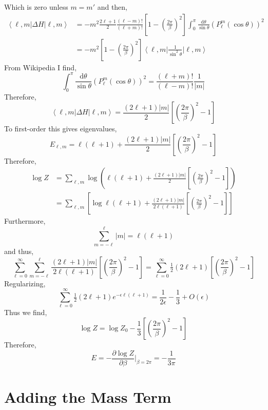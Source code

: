\documentclass[12pt]{extarticle}
\renewcommand{\d}[1]{\: \mathrm{d}#1 \:}
\newcommand{\pderiv}[2]{\frac{\partial{#1}}{\partial{#2}}}
\newcommand{\bra}[1]{\left< #1 \right|}
\newcommand{\ket}[1]{\left| #1 \right>}
\theoremstyle{definition}
\begin{document}
Which is zero unless $m = m'$ and then,
\begin{align*}
\bra{\ell, m} \Delta H \ket{\ell, m} & = -m^2 \frac{2 \ell + 1}{2} \frac{(\ell - m)!}{(\ell + m)!} \left[ 1 -  \left(\frac{2 \pi}{\beta} \right)^2  \right] \int_0^\pi \frac{\d{\theta}}{\sin{\theta}} (P^m_{\ell}(\cos{\theta}))^2 
\\
& = - m^2 \left[ 1 -  \left(\frac{2 \pi}{\beta} \right)^2  \right] \bra{\ell, m} \frac{1}{\sin^2{\theta}} \ket{\ell, m}
\end{align*}
From Wikipedia I find,
\[ \int_0^\pi \frac{\d{\theta}}{\sin{\theta}} (P^m_{\ell}(\cos{\theta}))^2 = \frac{(\ell + m)!}{(\ell - m)!} \frac{1}{|m|} \]
Therefore,
\[ \bra{\ell, m} \Delta H \ket{\ell, m} = \frac{(2 \ell + 1) |m| }{2} \left[ \left(\frac{2 \pi}{\beta} \right)^2 - 1 \right] \]
To first-order this gives eigenvalues,
\[ E_{\ell, m} = \ell (\ell + 1) + \frac{(2 \ell + 1) |m| }{2} \left[ \left(\frac{2 \pi}{\beta} \right)^2 - 1 \right] \]
Therefore,
\begin{align*}
\log{Z} & = \sum_{\ell, m} \log{\left( \ell (\ell + 1) + \frac{(2 \ell + 1) |m| }{2} \left[ \left(\frac{2 \pi}{\beta} \right)^2 - 1 \right] \right)}
\\
& = \sum_{\ell, m} \left[ \log{\ell(\ell + 1)} + \frac{(2 \ell + 1) |m| }{2 \ell(\ell + 1)} \left[ \left(\frac{2 \pi}{\beta} \right)^2 - 1 \right] \right]
\end{align*}
Furthermore,
\[ \sum_{m = -\ell}^\ell |m| = \ell(\ell + 1) \]
and thus,
\[ \sum_{\ell = 0}^\infty \sum_{m = - \ell}^\ell \frac{(2 \ell + 1) |m| }{2 \ell(\ell + 1)} \left[ \left(\frac{2 \pi}{\beta} \right)^2 - 1 \right]  = \sum_{\ell = 0}^\infty \tfrac{1}{2} (2\ell + 1) \left[ \left(\frac{2 \pi}{\beta} \right)^2 - 1 \right] \]
Regularizing,
\[ \sum_{\ell = 0}^\infty \tfrac{1}{2} (2\ell + 1) e^{-\epsilon \ell(\ell + 1)} =  \frac{1}{2 \epsilon} - \frac{1}{3} + O(\epsilon) \]
Thus we find,
\[ \log{Z} = \log{Z}_{0} - \frac{1}{3} \left[ \left(\frac{2 \pi}{\beta} \right)^2 - 1 \right] \]
Therefore,
\[ E = - \pderiv{\log{Z}}{\beta} \bigg|_{\beta = 2 \pi} = -\frac{1}{3 \pi} \]

\section{Adding the Mass Term}
\end{document}

